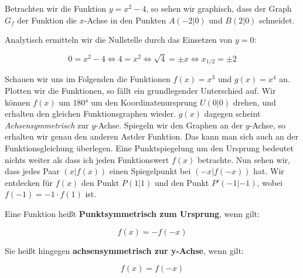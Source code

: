 \documentclass[ngerman, 12pt]{nssheetxea}
\begin{document}
\begin{example}
Betrachten wir die Funktion $y=x^2-4$, so sehen wir graphisch, dass der Graph $G_f$ der Funktion die $x$-Achse in den Punkten $A(-2|0)$ und $B(2|0)$ schneidet. 

\begin{center}
\end{center}
Analytisch ermitteln wir die Nullstelle durch das Einsetzen von $y=0$: 

\[ 0 = x^2 -4 \Leftrightarrow 4 = x^2 \Leftrightarrow \sqrt{4} = \pm x \Leftrightarrow x_{1/2}=\pm 2  \]
\end{example}

Schauen wir uns im Folgenden die Funktionen $f(x)=x^3$ und $g(x)=x^4$ an. Plotten wir die Funktionen, so fällt ein grundlegender Unterschied auf. Wir können $f(x)$ um $\ang{180}$ um den Koordinatenursprung $U(0|0)$ drehen, und erhalten den gleichen Funktionsgraphen wieder. $g(x)$ dagegen scheint \textit{Achsensymmetrisch} zur $y$-Achse. Spiegeln wir den Graphen an der $y$-Achse, so erhalten wir genau den anderen \glqq Ast\grqq der Funktion. Das kann man sich auch an der Funktionsgleichung überlegen. 
Eine Punktspiegelung um den Ursprung bedeutet nichts weiter als dass ich jeden Funktionswert $f(x)$ betrachte. Nun sehen wir, dass jedes Paar $(x|f(x))$ einen Spiegelpunkt bei $(-x|f(-x))$ hat. Wir entdecken für $f(x)$ den Punkt $P(1|1)$ und den Punkt $P'(-1|-1)$, wobei $f(-1)=-1 \cdot f(1)$ ist. 

\begin{definition}
Eine Funktion heißt \textbf{Punktsymmetrisch zum Ursprung}, wenn gilt:

\[ f(x) = - f(-x)\]

Sie heißt hingegen \textbf{achsensymmetrisch zur y-Achse}, wenn gilt:

\[ f(x)= f(-x)\]
\end{definition}
\end{document}
